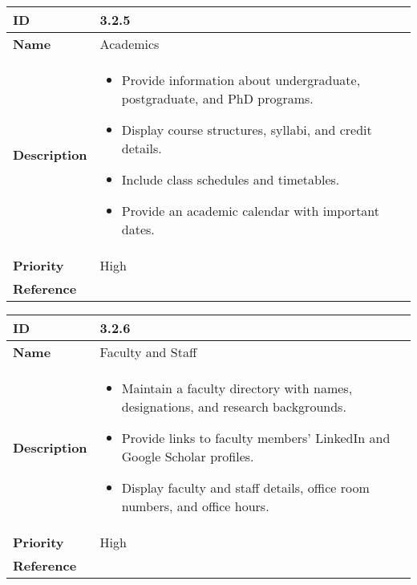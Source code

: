 \begin{center}
\begin{tabular}{ | >{\bfseries}m{5em} | m{10cm} |  } 
  \hline
  ID & 3.2.5\\  
  \hline
  Name & Academics \\  
  \hline
  Description & 
  \begin{itemize}
      \item Provide information about undergraduate, postgraduate, and PhD programs.
      \item Display course structures, syllabi, and credit details.
      \item Include class schedules and timetables.
      \item Provide an academic calendar with important dates.
  \end{itemize} \\ 
  \hline
  Priority & High\\
  \hline 
  Reference & \\
  \hline
\end{tabular}
\end{center}

\vspace{0.5cm}


\begin{center}
\begin{tabular}{ | >{\bfseries}m{5em} | m{10cm} |  } 
  \hline
  ID & 3.2.6\\  
  \hline
  Name & Faculty and Staff \\  
  \hline
  Description & 
  \begin{itemize}
      \item Maintain a faculty directory with names, designations, and research backgrounds.
      \item Provide links to faculty members' LinkedIn and Google Scholar profiles.
      \item Display faculty and staff details, office room numbers, and office hours.
  \end{itemize} \\ 
  \hline
  Priority & High\\
  \hline 
  Reference & \\
  \hline
\end{tabular}
\end{center}

\vspace{0.5cm}


